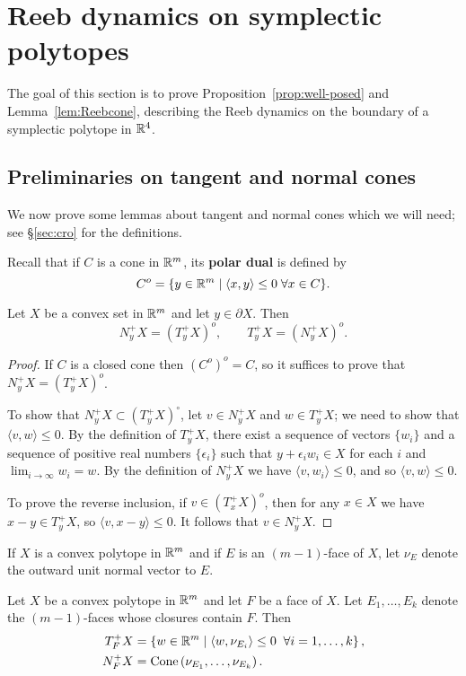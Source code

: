 \section{Reeb dynamics on symplectic polytopes}
\label{sec:rdsp} 

The goal of this section is to prove Proposition~\ref{prop:well-posed} and  Lemma~\ref{lem:Reebcone}, describing the Reeb dynamics on the boundary of a symplectic polytope in ${\mathbb R}^4$.

\subsection{Preliminaries on tangent and normal cones}

We now prove some lemmas about tangent and normal cones which we will need; see \S\ref{sec:cro} for the definitions.

Recall that if $C$ is a cone in ${\mathbb R}^m$, its {\bf polar dual\/} is defined by
\[
C^o=\{y\in{\mathbb R}^m\mid \langle x,y\rangle \le 0 \;\forall x\in C\}.
\]

\begin{lemma}
\label{lem:ntd}
Let $X$ be a convex set in ${\mathbb R}^m$ and let $y\in\partial X$. Then
\[
N_y^+X = (T_y^+X)^o, \quad\quad T_y^+X = (N_y^+X)^o.
\]
\end{lemma}

\begin{proof}
If $C$ is a closed cone then $(C^o)^o = C$, so it suffices to prove that $N_y^+X = (T_y^+X)^o$.

To show that $N_y^+X\subset (T_y^+X)^\circ$, let $v\in N_y^+X$ and $w\in T_y^+X$; we need to show that $\langle v,w\rangle \le 0$. By the definition of $T_y^+X$, there exist a sequence of vectors $\{w_i\}$ and a sequence of positive real numbers $\{\epsilon_i\}$ such that $y+\epsilon_iw_i\in X$ for each $i$ and $\lim_{i\to\infty}w_i=w$. By the definition of $N_y^+X$ we have $\langle v,w_i\rangle \le 0$, and so $\langle v,w\rangle \le 0$.

To prove the reverse inclusion, if $v\in (T_x^+X)^o$, then for any $x\in X$ we have $x-y\in T_y^+X$, so $\langle v,x-y\rangle \le 0$. It follows that $v\in N_y^+X$.
\end{proof}

If $X$ is a convex polytope in ${\mathbb R}^m$ and if $E$ is an $(m-1)$-face of $X$, let $\nu_E$ denote the outward unit normal vector to $E$.

\begin{lemma}
\label{lem:ncn}
Let $X$ be a convex polytope in ${\mathbb R}^m$ and let $F$ be a face of $X$. Let $E_1,\ldots, E_k$ denote the $(m-1)$-faces whose closures contain $F$. Then
\begin{align}
\label{eqn:TFcone}
T_F^+X &= \left\{w\in {\mathbb R}^m \mid \langle w,\nu_{E_i}\rangle \le 0 \;\; \forall i=1,\ldots,k \right\},
\\
\label{eqn:NFcone}
N_F^+X & = \operatorname{Cone}
	\left(
			\nu_{E_1},\ldots, \nu_{E_k}
	\right).
\end{align}
\end{lemma}

